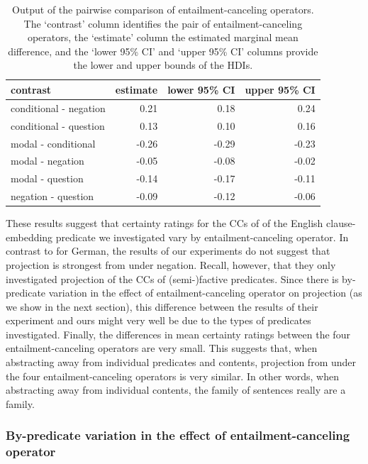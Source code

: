 \documentclass[a4paper,12pt,twoside]{article}
\begin{document}
        \begin{table}[!h]
        \centering
        \begin{tabular}{lrrr}
         contrast & estimate & lower 95\% CI & upper 95\% CI \\\hline 
         conditional - negation & 0.21 & 0.18 & 0.24 \\ 
          conditional - question & 0.13 & 0.10 & 0.16 \\ 
          modal - conditional & -0.26 & -0.29 & -0.23 \\ 
          modal - negation & -0.05 & -0.08 & -0.02 \\ 
          modal - question & -0.14 & -0.17 & -0.11 \\ 
          negation - question & -0.09 & -0.12 & -0.06 \\ 
        \end{tabular}
        \caption{Output of the pairwise comparison of entailment-canceling operators. The `contrast' column identifies the pair of entailment-canceling operators, the `estimate' column the estimated marginal mean difference, and the `lower 95\% CI' and `upper 95\% CI' columns provide the lower and upper bounds of the HDIs.}\label{t:pairwise}
        \end{table}
        
 These results suggest that certainty ratings for the CCs of of the English clause-embedding predicate we investigated vary by entailment-canceling operator. In contrast to \citet{sieker_projective_2022} for German, the results of our experiments do not suggest that projection is strongest from under negation. Recall, however, that they only investigated projection of the CCs of (semi-)factive predicates. Since there is by-predicate variation in the effect of entailment-canceling operator on projection (as we show in the next section), this difference between the results of their experiment and ours might very well be due to the types of predicates investigated. Finally, the differences in mean certainty ratings between the four entailment-canceling operators are very small. This suggests that, when abstracting away from individual predicates and contents, projection from under the four entailment-canceling operators is very similar. In other words, when abstracting away from individual  contents, the family of sentences really are a family.
 
	\subsubsection{By-predicate variation in the effect of entailment-canceling operator}\label{s:by-pred}
\end{document}
